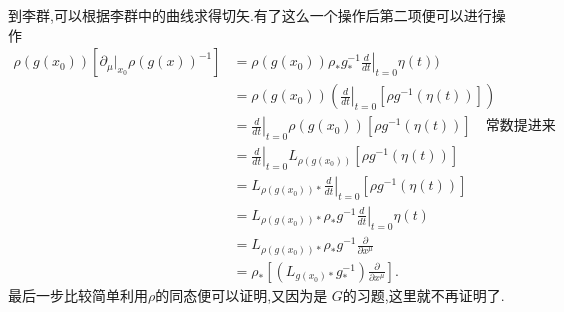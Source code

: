 \documentclass[../main.tex]{subfiles}
\begin{document}
到李群,可以根据李群中的曲线求得切矢.有了这么一个操作后第二项便可以进行操作
\begin{align*}
   \rho(g(x_0))[\partial_\mu|_{x_0} \rho(g(x))^{-1}] & = \rho(g(x_0)) \rho_* g^{-1}_*\left.\frac{d}{d t}\right|_{t = 0} \eta(t) )\\
                                                     & = \rho(g(x_0))  (\left.\frac{d}{d t}\right|_{t = 0} [\rho g^{-1}(\eta(t)) ])\\
                                                     & = \left.\frac{d}{d t}\right|_{t = 0} \rho(g(x_0))[\rho g^{-1}(\eta(t)) ]\quad \text{常数提进来}\\
                                                     & = \left.\frac{d}{d t}\right|_{t = 0} L_{\rho(g(x_0))}[\rho g^{-1}(\eta(t)) ]\\
                                                     & =L_{\rho(g(x_0))*} \left.\frac{d}{d t}\right|_{t = 0} [\rho g^{-1}(\eta(t)) ]\\
                                                     & = L_{\rho(g(x_0))*} \rho_*g^{-1}\left.\frac{d}{d t}\right|_{t = 0} \eta(t) \\
                                                     & =  L_{\rho(g(x_0))*} \rho_*g^{-1} \frac{\partial}{\partial x^\mu} \\
                                                     & = \rho_*\left[ (L_{g(x_0)*} g^{-1}_*) \frac{\partial}{\partial x^\mu} \right] 
.\end{align*}
最后一步比较简单利用$\rho$的同态便可以证明,又因为是 $G$的习题,这里就不再证明了.
\end{document}
